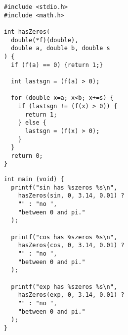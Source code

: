 
\begin{frame}[fragile]
%
\begin{codebox}
\begin{verbatim}
#include <stdio.h>
#include <math.h>

int hasZeros(
  double(*f)(double), 
  double a, double b, double s 
) {
  if (f(a) == 0) {return 1;}
  
  int lastsgn = (f(a) > 0);
  
  for (double x=a; x<b; x+=s) {
    if (lastsgn != (f(x) > 0)) {
      return 1;
    } else {
      lastsgn = (f(x) > 0);
    }
  }
  return 0;
}
\end{verbatim}
\end{codebox}
%
\begin{codebox}[...Fortsetzung]
\begin{verbatim}
int main (void) {
  printf("sin has %szeros %s\n",
    hasZeros(sin, 0, 3.14, 0.01) ? 
    "" : "no ",
    "between 0 and pi."
  );
  
  printf("cos has %szeros %s\n",
    hasZeros(cos, 0, 3.14, 0.01) ? 
    "" : "no ",
    "between 0 and pi."
  );
  
  printf("exp has %szeros %s\n",
    hasZeros(exp, 0, 3.14, 0.01) ? 
    "" : "no ",
    "between 0 and pi."
  );
}
\end{verbatim}
\end{codebox}
%
\end{frame}


